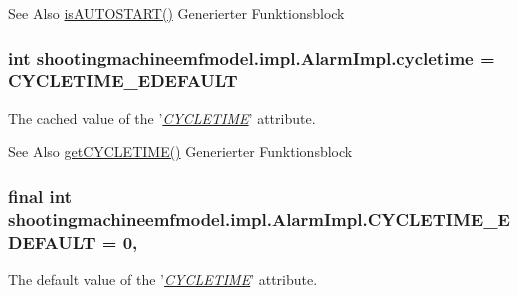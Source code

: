 \begin{DoxySeeAlso}{See Also}
\hyperlink{classshootingmachineemfmodel_1_1impl_1_1_alarm_impl_abf52c0d2ad03e0367f3f315a4683c14f}{is\-A\-U\-T\-O\-S\-T\-A\-R\-T()} Generierter Funktionsblock  
\end{DoxySeeAlso}
\hypertarget{classshootingmachineemfmodel_1_1impl_1_1_alarm_impl_a46d6e8977ebf62cb1750a0ae81d7cf1e}{
\subsubsection[{cycletime}]{\setlength{\rightskip}{0pt plus 5cm}int shootingmachineemfmodel.\-impl.\-Alarm\-Impl.\-cycletime = {\bf C\-Y\-C\-L\-E\-T\-I\-M\-E\-\_\-\-E\-D\-E\-F\-A\-U\-L\-T}\hspace{0.3cm}{\ttfamily [protected]}}}\label{classshootingmachineemfmodel_1_1impl_1_1_alarm_impl_a46d6e8977ebf62cb1750a0ae81d7cf1e}
The cached value of the '\hyperlink{classshootingmachineemfmodel_1_1impl_1_1_alarm_impl_a5bf352e51eec89bd76092fb853ddde24}{{\itshape C\-Y\-C\-L\-E\-T\-I\-M\-E}}' attribute.

\begin{DoxySeeAlso}{See Also}
\hyperlink{classshootingmachineemfmodel_1_1impl_1_1_alarm_impl_a5bf352e51eec89bd76092fb853ddde24}{get\-C\-Y\-C\-L\-E\-T\-I\-M\-E()} Generierter Funktionsblock  
\end{DoxySeeAlso}
\hypertarget{classshootingmachineemfmodel_1_1impl_1_1_alarm_impl_a8014dd85bb93f14eda34c8ba7fd6e572}{
\subsubsection[{C\-Y\-C\-L\-E\-T\-I\-M\-E\-\_\-\-E\-D\-E\-F\-A\-U\-L\-T}]{\setlength{\rightskip}{0pt plus 5cm}final int shootingmachineemfmodel.\-impl.\-Alarm\-Impl.\-C\-Y\-C\-L\-E\-T\-I\-M\-E\-\_\-\-E\-D\-E\-F\-A\-U\-L\-T = 0\hspace{0.3cm}{\ttfamily [static]}, {\ttfamily [protected]}}}\label{classshootingmachineemfmodel_1_1impl_1_1_alarm_impl_a8014dd85bb93f14eda34c8ba7fd6e572}
The default value of the '\hyperlink{classshootingmachineemfmodel_1_1impl_1_1_alarm_impl_a5bf352e51eec89bd76092fb853ddde24}{{\itshape C\-Y\-C\-L\-E\-T\-I\-M\-E}}' attribute.

